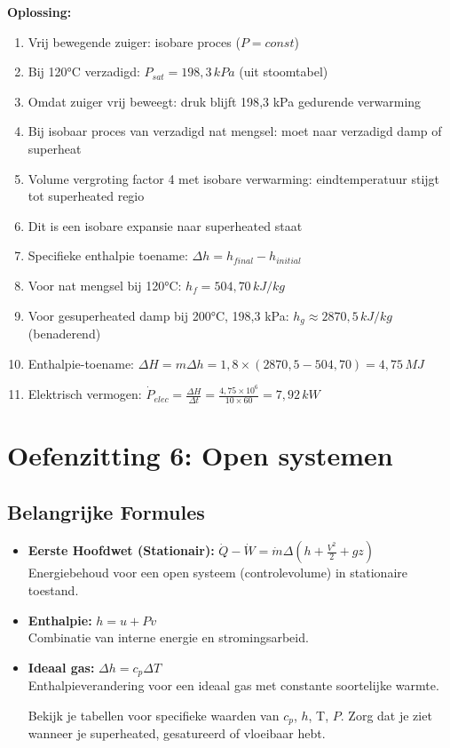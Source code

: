 \documentclass[a4paper,11pt,twoside]{report}
\newcounter{opgave}[section]
\begin{document}
\textbf{Oplossing:}
\begin{enumerate}
    \item Vrij bewegende zuiger: isobare proces ($P = const$)
    \item Bij 120°C verzadigd: $P_{sat} = 198{,}3 \, kPa$ (uit stoomtabel)
    \item Omdat zuiger vrij beweegt: druk blijft 198{,}3 kPa gedurende verwarming
    \item Bij isobaar proces van verzadigd nat mengsel: moet naar verzadigd damp of superheat
    \item Volume vergroting factor 4 met isobare verwarming: eindtemperatuur stijgt tot superheated regio
    \item Dit is een isobare expansie naar superheated staat
    \item Specifieke enthalpie toename: $\Delta h = h_{final} - h_{initial}$
    \item Voor nat mengsel bij 120°C: $h_f = 504{,}70 \, kJ/kg$
    \item Voor gesuperheated damp bij 200°C, 198{,}3 kPa: $h_g \approx 2870{,}5 \, kJ/kg$ (benaderend)
    \item Enthalpie-toename: $\Delta H = m \Delta h = 1{,}8 \times (2870{,}5 - 504{,}70) = 4{,}75 \, MJ$
    \item Elektrisch vermogen: $\dot{P}_{elec} = \frac{\Delta H}{\Delta t} = \frac{4{,}75 \times 10^6}{10 \times 60} = 7{,}92 \, kW$
\end{enumerate}


\section{Oefenzitting 6: Open systemen}
\setcounter{opgave}{0}
\subsection*{Belangrijke Formules}
\begin{itemize}
    \item \textbf{Eerste Hoofdwet (Stationair):} $\dot{Q} - \dot{W} = \dot{m} \Delta (h + \frac{V^2}{2} + gz)$ \\
    Energiebehoud voor een open systeem (controlevolume) in stationaire toestand.
    \item \textbf{Enthalpie:} $h = u + Pv$ \\
    Combinatie van interne energie en stromingsarbeid.
    \item \textbf{Ideaal gas:} $\Delta h = c_p \Delta T$ \\
    Enthalpieverandering voor een ideaal gas met constante soortelijke warmte.

    Bekijk je tabellen voor specifieke waarden van $c_p$, $h$, T, $P$. Zorg dat je ziet wanneer je superheated, gesatureerd of vloeibaar hebt.
\end{itemize}
\end{document}
